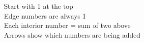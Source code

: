 \documentclass[preview]{standalone}
\begin{document}
Start with 1 at the top\\Edge numbers are always 1\\Each interior number = sum of two above\\Arrows show which numbers are being added\\
\end{document}
